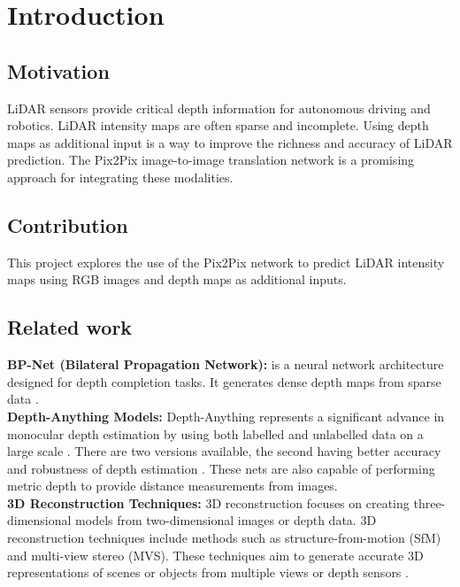 \chapter{Introduction}
\label{chap:intro}

\section{Motivation}
\label{sect:motivation}
LiDAR sensors provide critical depth information for autonomous driving and robotics. LiDAR intensity maps are often sparse and incomplete. Using depth maps as additional input is a way to improve the richness and accuracy of LiDAR prediction. The Pix2Pix image-to-image translation network is a promising approach for integrating these modalities.
\section{Contribution}
This project explores the use of the Pix2Pix network to predict LiDAR intensity maps using RGB images and depth maps as additional inputs.
\section{Related work}
\textbf{BP-Net (Bilateral Propagation Network):} is a neural network architecture designed for depth completion tasks. It generates dense depth maps from sparse data \cite{BP-Net}. \\
\newline \textbf{Depth-Anything Models:}  Depth-Anything represents a significant advance in monocular depth estimation by using both labelled and unlabelled data on a large scale \cite{depthanything}. There are two versions available, the second having better accuracy and robustness of depth estimation \cite{depth_anything_v2}. These nets are also capable of performing metric depth to provide distance measurements from images.
\\ \textbf{3D Reconstruction Techniques:} 3D reconstruction focuses on creating three-dimensional models from two-dimensional images or depth data. 3D reconstruction techniques include methods such as structure-from-motion (SfM) and multi-view stereo (MVS). These techniques aim to generate accurate 3D representations of scenes or objects from multiple views or depth sensors \cite{saxena2008depth}.




